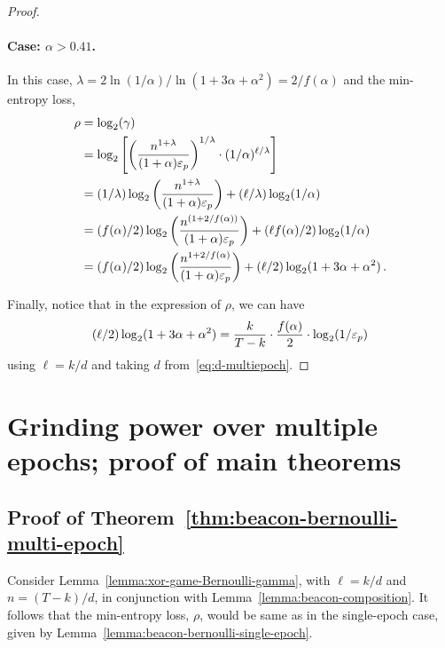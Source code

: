 \begin{proof}
  \paragraph{Case: $\alpha > 0.41$.}
  In this case, $\lambda = 2 \ln(1/\alpha)/\ln(1+3\alpha+\alpha^2) = 2/f(\alpha)$ and 
  the min-entropy loss, 
  \begin{align*}
    \rho &= \log_2(\gamma) \\
        &= \log_2 \left[  \left(\frac{n^{1 + \lambda} }{ (1+\alpha) \mathsf{\varepsilon}_p} \right)^{1/\lambda}
          \cdot (1/\alpha)^{\ell/\lambda}
        \right] \\
        &= (1/\lambda) \log_2 \left(\frac{n^{1 + \lambda} }{ (1+\alpha) \mathsf{\varepsilon}_p} \right)
          + (\ell/\lambda) \log_2(1/\alpha)
        \\
        &= (f(\alpha)/2)\log_2 \left(\frac{n^{(1 + 2/f(\alpha))} }{ (1+\alpha) \mathsf{\varepsilon}_p} \right) 
          + (\ell f(\alpha)/2) \log_2(1/\alpha)
          \\
        &= (f(\alpha)/2)\log_2 \left(\frac{n^{1 + 2/f(\alpha)} }{ (1+\alpha) \mathsf{\varepsilon}_p} \right) 
          + (\ell/2) \log_2(1 + 3\alpha + \alpha^2)
        \,.
  \end{align*}

  Finally, notice that in the expression of $\rho$, we can have
  $$
  (\ell/2) \log_2(1+3\alpha + \alpha^2) = \frac{k}{T-k} \cdot \frac{f(\alpha)}{2}\cdot \log_2(1/\mathsf{\varepsilon}_p)
  $$
  using $\ell = k/d$ and taking $d$ from~\eqref{eq:d-multiepoch}.
\end{proof}





\section{Grinding power over multiple epochs; proof of main theorems}

\subsection*{Proof of Theorem~\ref{thm:beacon-bernoulli-multi-epoch}}
  Consider Lemma~\ref{lemma:xor-game-Bernoulli-gamma}, 
  with $\ell = k/d$ and $n = (T-k)/d$, 
  in conjunction with Lemma~\ref{lemma:beacon-composition}.
  It follows that the min-entropy loss, $\rho$, 
  would be same as in the single-epoch case, 
  given by Lemma~\ref{lemma:beacon-bernoulli-single-epoch}.

